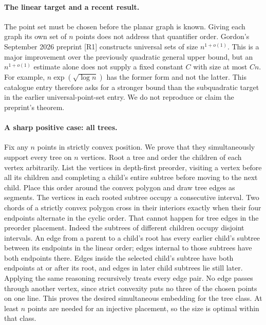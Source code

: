 \documentclass[11pt,a4paper]{article}
\begin{document}
\paragraph{The linear target and a recent result.}
The point set must be chosen before the planar graph is known.
Giving each graph its own set of $n$ points does not address
that quantifier order. Gordon's September 2026 preprint [R1]
constructs universal sets of size $n^{1+o(1)}$. This is a major
improvement over the previously quadratic general upper bound,
but an $n^{1+o(1)}$ estimate alone does not supply a fixed
constant $C$ with size at most $Cn$. For example,
$n\exp(\sqrt{\log n})$ has the former form and not the latter.
This catalogue entry therefore asks for a stronger bound than
the subquadratic target in the earlier universal-point-set
entry. We do not reproduce or claim the preprint's theorem.

\paragraph{A sharp positive case: all trees.}
Fix any $n$ points in strictly convex position. We prove that
they simultaneously support every tree on $n$ vertices.
Root a tree and order the children of each vertex arbitrarily.
List the vertices in depth-first preorder, visiting a vertex
before all its children and completing a child's entire
subtree before moving to the next child. Place this order
around the convex polygon and draw tree edges as segments.
The vertices in each rooted subtree occupy a consecutive
interval. Two chords of a strictly convex polygon cross in
their interiors exactly when their four endpoints alternate
in the cyclic order. That cannot happen for tree edges in
the preorder placement. Indeed the subtrees of different
children occupy disjoint intervals. An edge from a parent
to a child's root has every earlier child's subtree between
its endpoints in the linear order; edges internal to those
subtrees have both endpoints there. Edges inside the selected
child's subtree have both endpoints at or after its root,
and edges in later child subtrees lie still later. Applying
the same reasoning recursively treats every edge pair.
No edge passes through another vertex, since strict convexity
puts no three of the chosen points on one line. This proves
the desired simultaneous embedding for the tree class.
At least $n$ points are needed for an injective placement,
so the size is optimal within that class.
\end{document}

